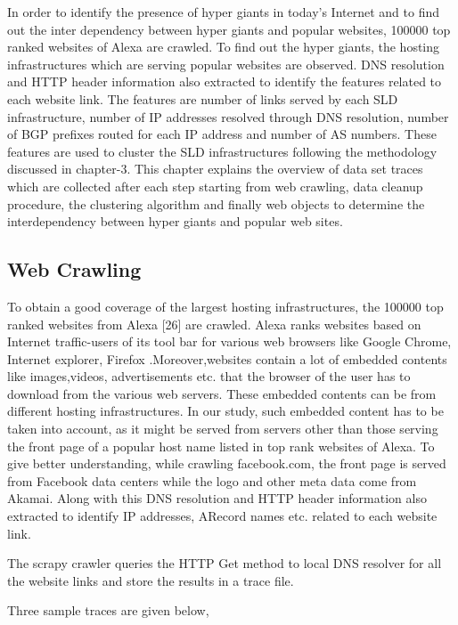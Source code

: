 In order to identify the presence of hyper giants in today's Internet and to find out the inter dependency between hyper giants and popular websites, 100000 top ranked websites of Alexa are crawled. To find out the hyper giants, the hosting infrastructures which are serving popular websites are observed. DNS resolution and HTTP header information also extracted to identify the features related to each website link. The features are number of links served by each SLD infrastructure, number of IP addresses resolved through DNS resolution, number of BGP prefixes routed for each IP address and number of AS numbers. These features are used to cluster the SLD infrastructures following the methodology discussed in chapter-3. This chapter explains the overview of data set traces which are collected after each step starting from web crawling, data cleanup procedure, the clustering algorithm and finally web objects to determine the interdependency between hyper giants and popular web sites.
\subsection{Web Crawling}
To obtain a good coverage of the largest hosting infrastructures, the 100000 top ranked websites from Alexa [26] are crawled. Alexa ranks websites based on Internet traffic-users of its tool bar for various web browsers like Google Chrome, Internet explorer, Firefox .Moreover,websites contain a lot of embedded contents like images,videos, advertisements etc. that the browser of the user has to download from the various web servers. These embedded contents can be from different hosting infrastructures. In our study, such embedded content has to be taken into account, as it might be served from servers other than those serving the front page of a popular host name listed in top rank websites of Alexa. To give better understanding, while crawling facebook.com, the front page is served from Facebook data centers while the logo and other meta data come from Akamai. Along with this DNS resolution and HTTP header information also extracted to identify IP addresses, ARecord names etc. related to each website link.

The scrapy crawler queries the HTTP Get method to local DNS resolver for all the website links and store the results in a trace file.

Three sample traces are given below,

\begin{center}
\end{center}


